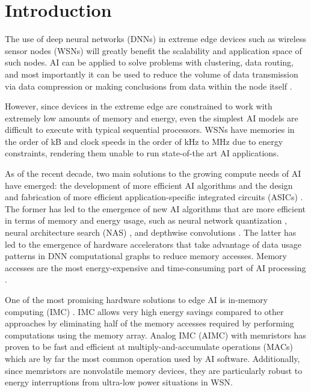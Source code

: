 \chapter{Introduction}

The use of deep neural networks (DNNs) in extreme edge devices such as wireless sensor nodes (WSNs) will greatly benefit the scalability and application space of such nodes. AI can be applied to solve problems with clustering, data routing, and most importantly it can be used to reduce the volume of data transmission via data compression or making conclusions from data within the node itself \cite{alsheikh2014machine}.

However, since devices in the extreme edge are constrained to work with extremely low amounts of memory and energy, even the simplest AI models are difficult to execute with typical sequential processors. WSNs have memories in the order of kB and clock speeds in the order of kHz to MHz due to energy constraints, rendering them unable to run state-of-the art AI applications.

As of the recent decade, two main solutions to the growing compute needs of AI have emerged: the development of more efficient AI algorithms and the design and fabrication of more efficient application-specific integrated circuits (ASICs) \cite{}. The former has led to the emergence of new AI algorithms that are more efficient in terms of memory and energy usage, such as neural network quantization \cite{jacob2018quantization}, neural architecture search (NAS) \cite{lin2020mcunet}, and depthwise convolutions \cite{sandler2018mobilenetv2}. The latter has led to the emergence of hardware accelerators that take advantage of data usage patterns in DNN computational graphs to reduce memory accesses. Memory accesses are the most energy-expensive and time-consuming part of AI processing \cite{horowitz20141}. 

One of the most promising hardware solutions to edge AI is in-memory computing (IMC) \cite{sebastian2020memory}. IMC allows very high energy savings compared to other approaches by eliminating half of the memory accesses required by performing computations using the memory array. Analog IMC (AIMC) with memristors has proven to be fast and efficient at multiply-and-accumulate operations (MACs) which are by far the most common operation used by AI software. Additionally, since memristors are nonvolatile memory devices, they are particularly robust to energy interruptions from ultra-low power situations in WSN. 

